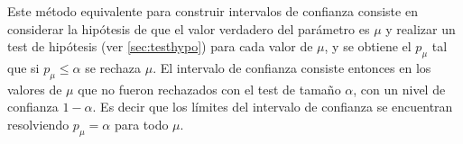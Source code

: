 






Este método equivalente para construir intervalos de confianza consiste en
considerar la hipótesis de que el valor verdadero del parámetro es $\mu$ y
realizar un test de hipótesis (ver \cref{sec:testhypo}) para cada valor de
$\mu$, y se obtiene el {\pvalue} $p_\mu$ tal que si  $p_\mu \leq \alpha$
se rechaza $\mu$. El intervalo de confianza consiste entonces en los valores
de $\mu$ que no fueron rechazados con el test de tamaño $\alpha$, con un
nivel de confianza $1-\alpha$. Es decir que los límites del intervalo de
confianza se encuentran resolviendo $p_\mu = \alpha$ para todo $\mu$.


